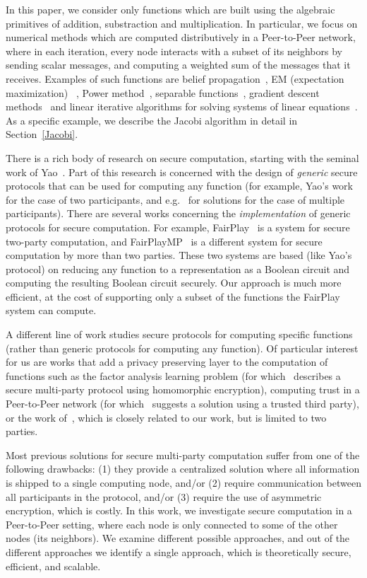\documentclass[times, 10pt,twocolumn]{article}
\begin{document}
In this paper, we consider only functions which are built using
the algebraic primitives of addition, substraction and
multiplication. In particular, we  focus on numerical methods
which are computed distributively in a Peer-to-Peer network, where
in each iteration, every node interacts with a subset of its
neighbors by sending scalar messages, and computing a weighted sum
of the messages that it receives. Examples of such functions are
belief propagation~\cite{BibDB:BookPearl}, EM (expectation
maximization) ~\cite{Canny}, Power method~\cite{EigenTrust},
separable functions~\cite{Separable}, gradient descent
methods~\cite{PP3} and linear iterative algorithms for solving
systems of linear equations~\cite{BibDB:BookBertsekasTsitsiklis}.
As a specific example, we describe the Jacobi algorithm in detail
in Section~\ref{Jacobi}.


There is a rich body of research on secure computation, starting
with the seminal work of Yao~\cite{Yao}. Part of this research is
concerned with the design of {\em generic} secure protocols that
can be used for computing any function (for example, Yao's
work~\cite{Yao} for the case of two participants, and
e.g.~\cite{BGW,GMW} for solutions for the case of multiple
participants).  There are several works concerning the {\em
implementation} of generic protocols for secure computation. For
example, FairPlay~\cite{Fairplay} is a system for secure two-party
computation, and FairPlayMP~\cite{FairPlayMP} is a different
system for secure computation by more than two parties.  These two
systems are based (like Yao's protocol) on reducing any function
to a representation as a Boolean circuit and computing the
resulting Boolean circuit securely. Our approach is much more
efficient, at the cost of supporting only a subset of the
functions the FairPlay system can compute.

A different line of work studies secure protocols for computing
specific functions (rather than generic protocols for computing any
function). Of particular interest for us are works that add
a privacy preserving layer to the computation of functions such as the
factor analysis learning problem (for which~\cite{Canny} describes a
secure multi-party protocol using homomorphic encryption),
computing trust in a Peer-to-Peer network (for which~\cite{EigenTrust}
suggests a solution using a trusted third party), or the work
of~\cite{PP3}, which is closely related to our work, but is limited to
two parties.

Most  previous solutions for secure multi-party computation suffer
from one of the following drawbacks: (1) they provide a
centralized solution where all information is shipped to a single
computing node, and/or (2) require communication between all
participants in the protocol, and/or (3) require the use of asymmetric
encryption, which is costly. In this work, we investigate
 secure computation in a Peer-to-Peer setting, where each
node is only connected to some of the other nodes (its neighbors).
We examine different possible approaches, and out of the different
approaches we identify a single approach, which is theoretically
secure, efficient, and scalable.
\end{document}
